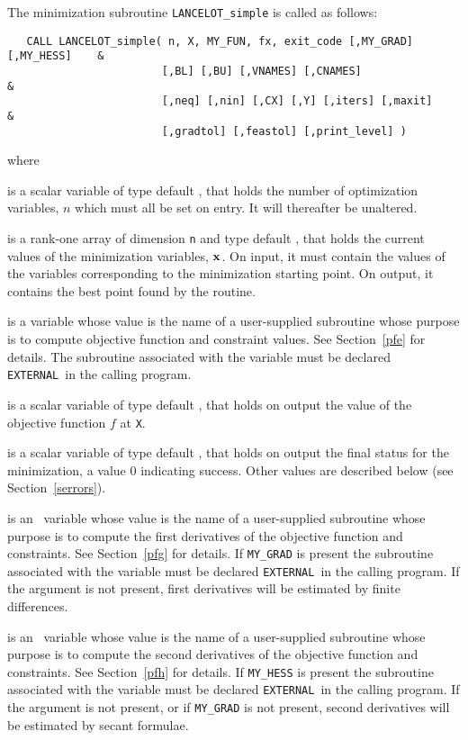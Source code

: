 \documentclass{galahad}
\newcommand{\external}{{\tt EXTERNAL}}
\begin{document}
The minimization subroutine {\tt LANCELOT\_simple} is called as follows:
\hskip0.5in
\def\baselinestretch{0.8} {\tt \begin{verbatim}
   CALL LANCELOT_simple( n, X, MY_FUN, fx, exit_code [,MY_GRAD] [,MY_HESS]    &
                        [,BL] [,BU] [,VNAMES] [,CNAMES]                       &
                        [,neq] [,nin] [,CX] [,Y] [,iters] [,maxit]            &
                        [,gradtol] [,feastol] [,print_level] )
\end{verbatim}}
\def\baselinestretch{1.0}
\noindent
where
\begin{description}
 is a scalar variable of type default \integer, that holds
the number of optimization variables, $n$ which must all be set on entry. It
will thereafter be unaltered.

 is a rank-one array of dimension {\tt n} and type
default \realdp, that holds the current values of the
minimization variables, ${\mathbf{x}}$. On input, it must contain the values of the
variables corresponding to the minimization starting point.  On output, it
contains the best point found by the routine.

 is a variable whose value is the name of a
user-supplied subroutine whose purpose is to compute objective function
and constraint values. See Section~\ref{pfe} for details.
The subroutine associated with the variable must be declared \external\
in the calling program.

 is a scalar variable of type default \realdp, that
holds  on output the value of the objective function $f$ at {\tt X}.

 is a scalar variable of type default \integer, that holds
on output the final status for the minimization, a value 0 indicating
success.  Other values are described below (see Section~\ref{serrors}).

 is an \optional\ variable whose value is the name of a
user-supplied subroutine whose purpose is to compute the first derivatives
of the objective function and constraints. See Section~\ref{pfg} for details.
If {\tt MY\_GRAD} is present the subroutine associated with the variable must be
declared \external\ in the calling program. If the argument is not present,
first derivatives will be estimated by finite differences.

 is an \optional\ variable whose value is the name of a
user-supplied subroutine whose purpose is to compute the second derivatives
of the objective function and constraints. See Section~\ref{pfh} for details.
If {\tt MY\_HESS} is present the subroutine associated with the variable must be
declared \external\ in the calling program. If the argument is not present,
or if {\tt MY\_GRAD} is not present,
second derivatives will be estimated by secant formulae.


\end{description}
\end{document}
